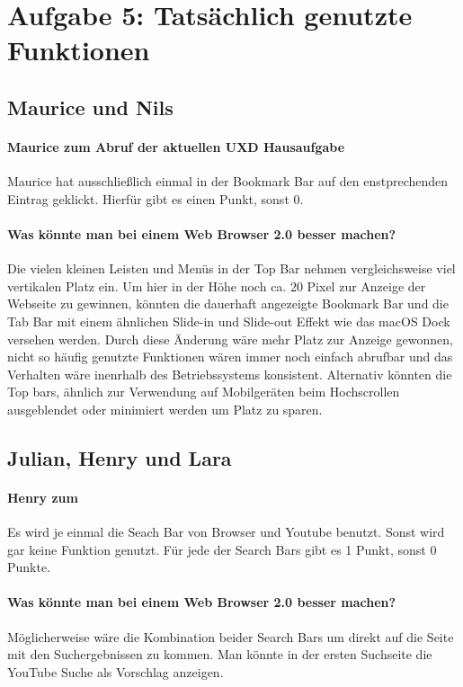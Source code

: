 \documentclass[a4paper,10pt]{article}
\begin{document}
    \section{Aufgabe 5: Tatsächlich genutzte Funktionen}
    \subsection{Maurice und Nils}
    \paragraph{Maurice zum Abruf der aktuellen UXD Hausaufgabe}
    Maurice hat ausschließlich einmal in der Bookmark Bar auf den enstprechenden Eintrag geklickt.
    Hierfür gibt es einen Punkt, sonst 0.

    \paragraph{Was könnte man bei einem Web Browser 2.0 besser machen?}
    Die vielen kleinen Leisten und Menüs in der Top Bar nehmen vergleichsweise viel vertikalen Platz ein.
    Um hier in der Höhe noch ca. 20 Pixel zur Anzeige der Webseite zu gewinnen, könnten die dauerhaft angezeigte Bookmark Bar und die Tab Bar mit einem ähnlichen Slide-in und Slide-out Effekt wie das macOS Dock versehen werden.
    Durch diese Änderung wäre mehr Platz zur Anzeige gewonnen, nicht so häufig genutzte Funktionen wären immer noch einfach abrufbar und das Verhalten wäre inenrhalb des Betriebssystems konsistent.
    Alternativ könnten die Top bars, ähnlich zur Verwendung auf Mobilgeräten beim Hochscrollen ausgeblendet oder minimiert werden um Platz zu sparen.

    \subsection{Julian, Henry und Lara}
    \paragraph{Henry zum }
    Es wird je einmal die Seach Bar von Browser und Youtube benutzt.
    Sonst wird gar keine Funktion genutzt.
    Für jede der Search Bars gibt es 1 Punkt, sonst 0 Punkte.

    \paragraph{Was könnte man bei einem Web Browser 2.0 besser machen?}
    Möglicherweise wäre die Kombination beider Search Bars um direkt auf die Seite mit den Suchergebnissen zu kommen.
    Man könnte in der ersten Suchseite die YouTube Suche als Vorschlag anzeigen.
\end{document}
